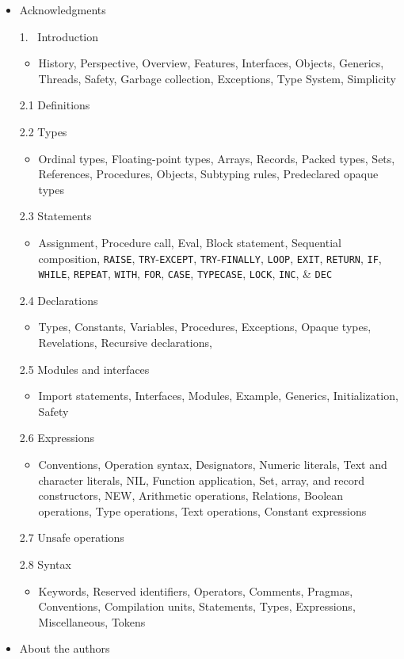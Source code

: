 \documentclass[10pt]{article}
\begin{document}
\begin{itemize}
\item Acknowledgments
\item[1.~] Introduction
   \begin{itemize}
  \item History, Perspective, Overview, Features, Interfaces, Objects,
    Generics, Threads, Safety, Garbage collection, Exceptions, Type System,
    Simplicity
  \end{itemize}
\item[2.1] Definitions
\item[2.2] Types
  \begin{itemize}
  \item Ordinal types, Floating-point types, Arrays, Records, Packed types,
    Sets, References, Procedures, Objects, Subtyping rules, Predeclared opaque
    types
  \end{itemize}
\item[2.3] Statements
  \begin{itemize}
  \item Assignment, Procedure call, Eval, Block statement, Sequential
    composition, \verb|RAISE|, \verb|TRY|-\verb|EXCEPT|,
    \verb|TRY|-\verb|FINALLY|, \verb|LOOP|, \verb|EXIT|, \verb|RETURN|,
    \verb|IF|, \verb|WHILE|, \verb|REPEAT|, \verb|WITH|, \verb|FOR|,
    \verb|CASE|, \verb|TYPECASE|, \verb|LOCK|, \verb|INC|, \& \verb|DEC|
  \end{itemize}
\item[2.4] Declarations
  \begin{itemize}
  \item Types, Constants, Variables, Procedures, Exceptions, Opaque types,
    Revelations, Recursive declarations,
  \end{itemize}
\item[2.5] Modules and interfaces
  \begin{itemize}
  \item Import statements, Interfaces, Modules, Example, Generics,
    Initialization, Safety
  \end{itemize}
\item[2.6] Expressions
  \begin{itemize}
  \item Conventions, Operation syntax, Designators, Numeric literals, Text and
    character literals, NIL, Function application, Set, array, and record
    constructors, NEW, Arithmetic operations, Relations, Boolean operations,
    Type operations, Text operations, Constant expressions
  \end{itemize}
\item[2.7] Unsafe operations
\item[2.8] Syntax
  \begin{itemize}
  \item Keywords, Reserved identifiers, Operators, Comments, Pragmas,
    Conventions, Compilation units, Statements, Types, Expressions,
    Miscellaneous, Tokens
  \end{itemize}
\item About the authors
\end{itemize}
\end{document}
